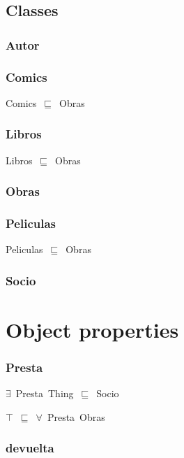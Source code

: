 \documentclass{article}
\begin{document}
\subsection*{Classes}

\subsubsection*{Autor}

\subsubsection*{Comics}

Comics~\ensuremath{\sqsubseteq}~Obras~

\subsubsection*{Libros}

Libros~\ensuremath{\sqsubseteq}~Obras~

\subsubsection*{Obras}

\subsubsection*{Peliculas}

Peliculas~\ensuremath{\sqsubseteq}~Obras~

\subsubsection*{Socio}

\section*{Object properties}\subsubsection*{Presta}

\ensuremath{\exists}~Presta~Thing~\ensuremath{\sqsubseteq}~Socio

\ensuremath{\top}~\ensuremath{\sqsubseteq}~\ensuremath{\forall}~Presta~Obras

\subsubsection*{devuelta}
\end{document}

